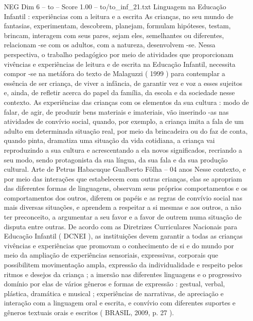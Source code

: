 \begin{textsample}{NEG Dim 6 – to – Score 1.00 – to/to\_inf\_21.txt}  \label{ex:f6_neg_116}
Linguagem na Educação Infantil : experiências com a leitura e a escrita As crianças, no seu mundo de fantasias, experimentam, descobrem, planejam, formulam hipóteses, testam, brincam, interagem com seus pares, sejam eles, semelhantes ou diferentes, relacionam -se com os adultos, com a natureza, desenvolvem -se.
Nessa perspectiva, o trabalho pedagógico por meio de atividades que proporcionam vivências e experiências de leitura e de escrita na Educação Infantil, necessita compor -se na metáfora do texto de Malaguzzi ( 1999 ) para contemplar a essência de ser criança, de viver a infância, de garantir vez e voz a esses sujeitos e, ainda, de refletir acerca do papel da família, da escola e da sociedade nesse contexto.
As experiências das crianças com os elementos da sua cultura : modo de falar, de agir, de produzir bens materiais e imateriais, vão inserindo -as nas atividades de convívio social, quando, por exemplo, a criança imita a fala de um adulto em determinada situação real, por meio da brincadeira ou do faz de conta, quando pinta, dramatiza uma situação da vida cotidiana, a criança vai reproduzindo a sua cultura e acrescentando a ela novos significados, recriando a seu modo, sendo protagonista da sua língua, da sua fala e da sua produção cultural.
Arte de Petrus Habacuque Gualberto Fôlha – 04 anos Nesse contexto, e por meio das interações que estabelecem com outras crianças, elas se apropriam das diferentes formas de linguagens, observam seus próprios comportamentos e os comportamentos dos outros, diferem os papéis e as regras de convívio social nas mais diversas situações, e aprendem a respeitar a si mesmas e aos outros, a não ter preconceito, a argumentar a seu favor e a favor de outrem numa situação de disputa entre outras.
De acordo com as Diretrizes Curriculares Nacionais para Educação Infantil ( DCNEI ), as instituições devem garantir a todas as crianças vivências e experiências que promovam o conhecimento de si e do mundo por meio da ampliação de experiências sensoriais, expressivas, corporais que possibilitem movimentação ampla, expressão da individualidade e respeito pelos ritmos e desejos da criança ; a imersão nas diferentes linguagens e o progressivo domínio por elas de vários gêneros e formas de expressão : gestual, verbal, plástica, dramática e musical ; experiências de narrativas, de apreciação e interação com a linguagem oral e escrita, e convívio com diferentes suportes e gêneros textuais orais e escritos ( BRASIL, 2009, p. 27 ).

\end{textsample}
